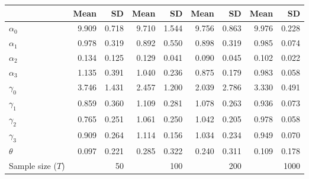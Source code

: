 
\begin{tabular}[t]{lrrrrrrrr}
\toprule
  & Mean & SD & Mean  & SD  & Mean   & SD   & Mean    & SD   \\
\midrule
$\alpha_{0}$ & 9.909 & 0.718 & 9.710 & 1.544 & 9.756 & 0.863 & 9.976 & 0.228\\
$\alpha_{1}$ & 0.978 & 0.319 & 0.892 & 0.550 & 0.898 & 0.319 & 0.985 & 0.074\\
$\alpha_{2}$ & 0.134 & 0.125 & 0.129 & 0.041 & 0.090 & 0.045 & 0.102 & 0.022\\
$\alpha_{3}$ & 1.135 & 0.391 & 1.040 & 0.236 & 0.875 & 0.179 & 0.983 & 0.058\\
$\gamma_{0}$ & 3.746 & 1.431 & 2.457 & 1.200 & 2.039 & 2.786 & 3.330 & 0.491\\
$\gamma_{1}$ & 0.859 & 0.360 & 1.109 & 0.281 & 1.078 & 0.263 & 0.936 & 0.073\\
$\gamma_{2}$ & 0.765 & 0.251 & 1.061 & 0.250 & 1.042 & 0.205 & 0.978 & 0.058\\
$\gamma_{3}$ & 0.909 & 0.264 & 1.114 & 0.156 & 1.034 & 0.234 & 0.949 & 0.070\\
$\theta$ & 0.097 & 0.221 & 0.285 & 0.322 & 0.240 & 0.311 & 0.109 & 0.178\\
Sample size ($T$) &  & 50 &  & 100 &  & 200 &  & 1000\\
\bottomrule
\end{tabular}
